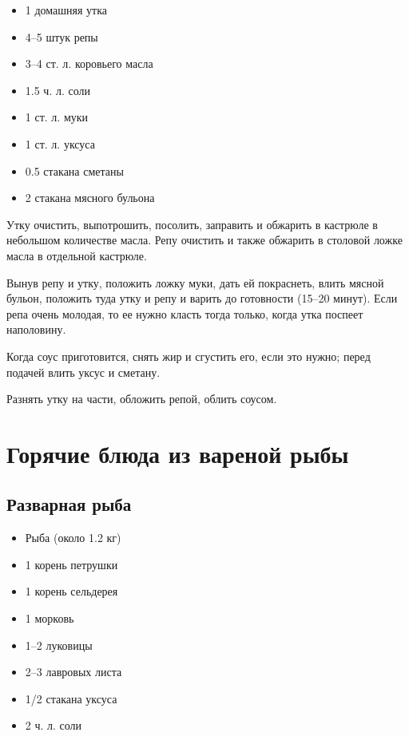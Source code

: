 \begin{itemize}
	\item 1 домашняя утка
    \item 4–5 штук репы 
    \item 3–4 ст. л. коровьего масла
    \item 1.5 ч. л. соли
    \item 1 ст. л. муки 
    \item 1 ст. л. уксуса 
    \item 0.5 стакана сметаны
    \item 2 стакана мясного бульона
\end{itemize}

Утку очистить, выпотрошить, посолить, заправить и обжарить в кастрюле в небольшом количестве масла. Репу очистить и также обжарить в столовой ложке масла в отдельной кастрюле.

Вынув репу и утку, положить ложку муки, дать ей покраснеть, влить мясной бульон, положить туда утку и репу и варить до готовности (15–20 минут). Если репа очень молодая, то ее нужно класть тогда только, когда утка поспеет наполовину.

Когда соус приготовится, снять жир и сгустить его, если это нужно; перед подачей влить уксус и сметану.

Разнять утку на части, обложить репой, облить соусом.


\newpage
\section{Горячие блюда из вареной рыбы}

\subsection{Разварная рыба}\label{1razvar-ryba}

\begin{itemize}
	\item Рыба (около 1.2 кг) 
    \item 1 корень петрушки
    \item 1 корень сельдерея
    \item 1 морковь
    \item 1–2 луковицы
    \item 2–3 лавровых листа
    \item 1/2 стакана уксуса
    \item 2 ч. л. соли
\end{itemize}

